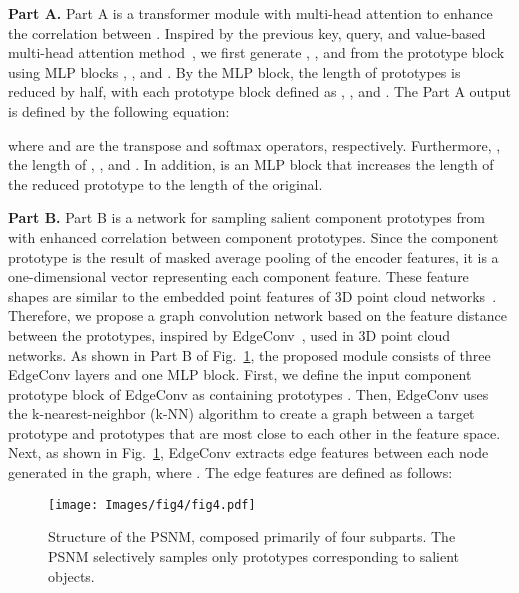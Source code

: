 \documentclass[runningheads]{llncs}
\begin{document}
	\noindent
	\textbf{Part A.} Part A is a transformer module with multi-head attention to enhance the correlation between . Inspired by the previous key, query, and value-based multi-head attention method~\cite{wang2018non,fu2019dual,zhang2019self}, we first generate , , and  from the prototype block  using MLP blocks , , and . By the MLP block, the length of prototypes is reduced by half, with each prototype block defined as , , and . The Part A output  is defined by the following equation:
	
	
	
	\noindent
	where  and  are the transpose and softmax operators, respectively. Furthermore, , the length of , , and . In addition,  is an MLP block that increases the length of the reduced prototype to the length of the original.
	
	\noindent
	\textbf{Part B.} Part B is a network for sampling salient component prototypes from  with enhanced correlation between component prototypes. Since the component prototype is the result of masked average pooling of the encoder features, it is a one-dimensional vector representing each component feature. These feature shapes are similar to the embedded point features of 3D point cloud networks~\cite{qi2017pointnet,qi2017pointnet++,wang2019dynamic}. Therefore, we propose a graph convolution network based on the feature distance between the prototypes, inspired by EdgeConv~\cite{wang2019dynamic}, used in 3D point cloud networks. As shown in Part B of Fig.~\ref{fig:module3}, the proposed module consists of three EdgeConv layers and one MLP block. First, we define the input component prototype block of EdgeConv as  containing prototypes . Then, EdgeConv uses the k-nearest-neighbor (k-NN) algorithm to create a graph between a target prototype  and  prototypes  that are most close to each other in the feature space. Next, as shown in Fig.~\ref{fig:module3}, EdgeConv extracts edge features  between each node generated in the graph, where . The edge features  are defined as follows:
	
	
	
	\begin{figure}[t]
		\setlength{\belowcaptionskip}{-24pt}
		\begin{center}
			\texttt{[image: Images/fig4/fig4.pdf]}
			\caption{Structure of the PSNM, composed primarily of four subparts. The PSNM selectively samples only prototypes corresponding to salient objects.}
			\label{fig:module3}
		\end{center}
	\end{figure}
	
\end{document}

